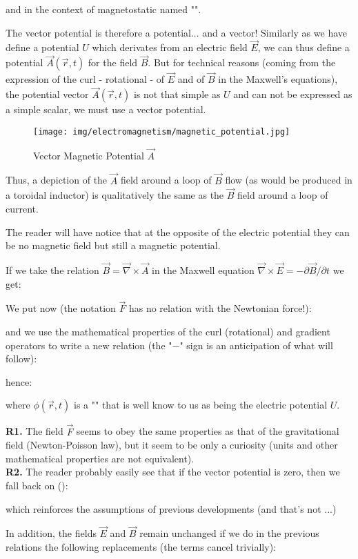 	and in the context of magnetostatic named "". 
	\begin{tcolorbox}[title=Remark,colframe=black,arc=10pt]
	The vector potential is therefore a potential... and a vector! Similarly as we have define a potential $U$ which derivates from an electric field $\vec{E}$, we can thus define a potential $\vec{A}(\vec{r},t)$ for the field $\vec{B}$. But for technical reasons (coming from the expression of the curl - rotational - of $\vec{E}$ and of $\vec{B}$ in the Maxwell's equations), the potential vector $\vec{A}(\vec{r},t)$ is not that simple as $U$ and can not be expressed as a simple scalar, we must use a vector potential.
	\end{tcolorbox}
	\begin{figure}[H]
		\centering
		\texttt{[image: img/electromagnetism/magnetic\_potential.jpg]}
		\caption{Vector Magnetic Potential $\vec{A}$}
	\end{figure}
	Thus, a depiction of the $\vec{A}$ field around a loop of $\vec{B}$ flow (as would be produced in a toroidal inductor) is qualitatively the same as the $\vec{B}$ field around a loop of current.
	
	The reader will have notice that at the opposite of the electric potential they can be no magnetic field but still a magnetic potential.
	
	If we take the relation $\vec{B}=\vec{\nabla}\times\vec{A}$ in the Maxwell equation $\vec{\nabla}\times\vec{E}=-\partial \vec{B}/\partial t$ we get:
	
	We put now (the notation $\vec{F}$ has no relation with the Newtonian force!):
	
	and we use the mathematical properties of the curl (rotational) and gradient operators to write a new relation (the "$-$" sign is an anticipation of what will follow):
	
	hence\label{electric field with potential vector}:
	
	where $\phi(\vec{r},t)$ is a "" that is well know to us as being the electric potential $U$. 
	\begin{tcolorbox}[title=Remarks,colframe=black,arc=10pt]
	\textbf{R1.} The field $\vec{F}$ seems to obey the same properties as that of the gravitational field (Newton-Poisson law), but it seem to be only a curiosity (units and other mathematical properties are not equivalent).\\
	
	\textbf{R2.} The reader probably easily see that if the vector potential is zero, then we fall back on ():
	
	which reinforces the assumptions of previous developments (and that's not ...)
	\end{tcolorbox}
	In addition, the fields $\vec{E}$ and $\vec{B}$ remain unchanged if we do in the previous relations the following replacements (the terms cancel trivially):
	
